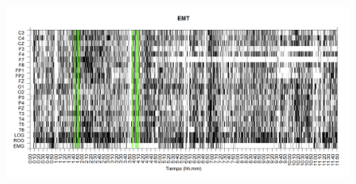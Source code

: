 \documentclass[12pt,a4paper]{mitthesis}
\begin{document}
\begin{figure}
\centering
\includegraphics[width=0.8\linewidth]
{./img_ejemplos/EMNNS_est.png} 
\label{grf_EMT}
\end{figure}

\end{document}
